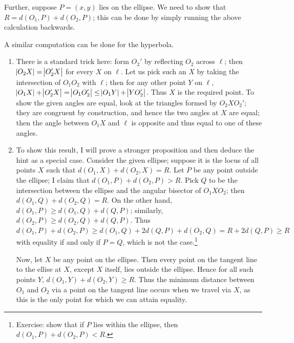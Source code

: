 \documentclass[a4paper,leqno,10pt]{article}
\theoremstyle{exercise}
\theoremstyle{plain}
\theoremstyle{definition}
\theoremstyle{remark}
\begin{document}
Further, suppose $ P = (x,y) $ lies on the ellipse. We need to show that $ R = d(O_1, P) + d(O_2, P) $; this can be done by simply running
the above calculation backwards.

A similar computation can be done for the hyperbola.

\begin{enumerate}
  \item There is a standard trick here: form $ O_2' $ by reflecting $ O_2 $ across $ \ell $; then $ \abs{O_2 X} = \abs{O_2' X} $ for
        every $ X $ on $ \ell $. Let us pick such an $ X $ by taking the intersection of $ O_1 O_2 $ with $ \ell $; then for any other
        point $ Y $ on $ \ell $, $ \abs{O_1 X} + \abs{O_2' X} = \abs{O_1 O_2'} \leq \abs{O_1 Y} + \abs{Y O_2'} $. Thus $ X $ is the
        required point. To show the given angles are equal, look at the triangles formed by $ O_2 X O_2' $; they are congruent
        by construction, and hence the two angles at $ X $ are equal; then the angle between $ O_1 X $ and $ \ell $ is opposite and thus
        equal to one of these angles.
  \item To show this result, I will prove a stronger proposition and then deduce the hint as a special case. Consider the given
        ellipse; suppose it is the locus of all points $ X $ such that $ d(O_1,X) + d(O_2,X) = R $. Let $ P $ be any point outside
        the ellipse; I claim that $ d(O_1,P) + d(O_2,P) > R $. Pick $ Q $ to be the intersection between the ellipse and the angular
        bisector of $ O_1 X O_2 $; then $ d(O_1, Q) + d(O_2, Q) = R $. On the other hand, $ d(O_1, P) \geq d(O_1, Q) + d(Q,P) $;
        similarly, $ d(O_2,P) \geq d(O_2,Q) + d(Q,P) $. Thus $ d(O_1, P) + d(O_2, P) \geq d(O_1, Q) + 2d(Q,P) + d(O_2, Q) = R + 2d(Q,P) \geq R $
        with equality if and only if $ P = Q $, which is not the case.\footnote{Exercise: show that if $ P $ lies within the
        ellipse, then $ d(O_1,P) + d(O_2,P) < R $.}

        Now, let $ X $ be any point on the ellipse. Then every point on the tangent line to the ellise at $ X $, except $ X $ itself,
        lies outside the ellipse. Hence for all such points $ Y $, $ d(O_1, Y) + d(O_2, Y) \geq R $. Thus the minimum distance between $ O_1 $
        and $ O_2 $ via a point on the tangent line occurs when we travel via $ X $, as this is the only point for which we can attain equality.


\end{enumerate}
\end{document}
